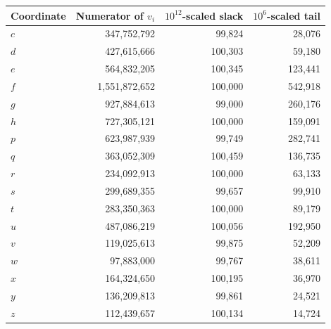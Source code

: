 \begin{tabular}{@{}lrrr@{}}
\toprule
Coordinate & Numerator of $v_i$ & $10^{12}$-scaled slack & $10^6$-scaled tail\\
\midrule
$c$ & 347,752,792 & 99,824 & 28,076 \\
$d$ & 427,615,666 & 100,303 & 59,180 \\
$e$ & 564,832,205 & 100,345 & 123,441 \\
$f$ & 1,551,872,652 & 100,000 & 542,918 \\
$g$ & 927,884,613 & 99,000 & 260,176 \\
$h$ & 727,305,121 & 100,000 & 159,091 \\
$p$ & 623,987,939 & 99,749 & 282,741 \\
$q$ & 363,052,309 & 100,459 & 136,735 \\
$r$ & 234,092,913 & 100,000 & 63,133 \\
$s$ & 299,689,355 & 99,657 & 99,910 \\
$t$ & 283,350,363 & 100,000 & 89,179 \\
$u$ & 487,086,219 & 100,056 & 192,950 \\
$v$ & 119,025,613 & 99,875 & 52,209 \\
$w$ & 97,883,000 & 99,767 & 38,611 \\
$x$ & 164,324,650 & 100,195 & 36,970 \\
$y$ & 136,209,813 & 99,861 & 24,521 \\
$z$ & 112,439,657 & 100,134 & 14,724 \\
\bottomrule
\end{tabular}
